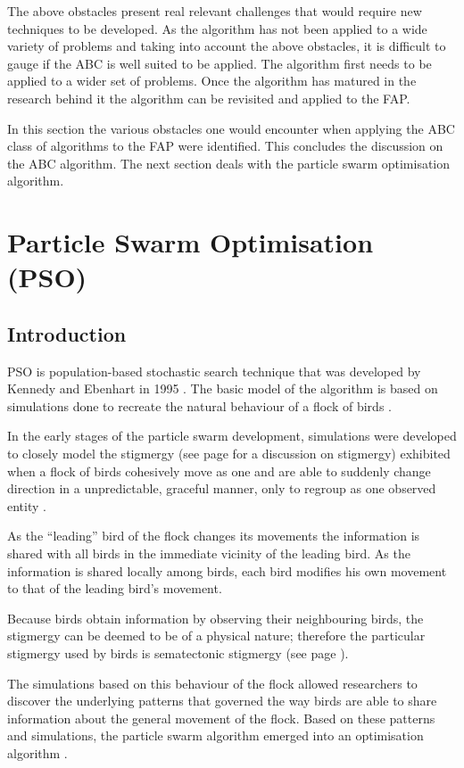 The above obstacles present real relevant challenges that would require new techniques to be developed. As the algorithm has not been applied to a wide variety of problems and taking into account the above obstacles, it is difficult to gauge if the ABC is well suited to be applied. The algorithm first needs to be applied to a wider set of problems. Once the algorithm has matured in the research behind it the algorithm can be revisited and applied to the FAP.

In this section the various obstacles one would encounter when applying the ABC class of algorithms to the FAP were identified. This concludes the discussion on the ABC algorithm. The next section deals with the particle swarm optimisation algorithm.
\section{Particle Swarm Optimisation (PSO)}

\label{sec:PSO}
\subsection{Introduction}
\label{sec:psointro}
PSO is population-based stochastic search technique that was developed by Kennedy and Ebenhart in 1995 \cite{PSOGABreeding}. The basic model of the algorithm is based on simulations done to recreate the natural behaviour of a flock of birds \cite{PSOSoftTesting}.

In the early stages of the particle swarm development, simulations were developed to closely model the stigmergy (see page \pageref{sec:stigmergy} for a discussion on stigmergy) exhibited when a flock of birds cohesively move as one and are able to suddenly change direction in a unpredictable, graceful manner, only to regroup as one observed entity \cite{PSOHybridJobShop}. 

As the ``leading'' bird of the flock changes its movements the information is shared with all birds in the immediate vicinity of the leading bird. As the information is shared locally among birds, each bird modifies his own movement to that of the leading bird's movement\cite{PSOHybridJobShop}. 

Because birds obtain information by observing their neighbouring birds, the stigmergy can be deemed to be of a physical nature; therefore the particular stigmergy used by birds is sematectonic stigmergy (see page \pageref{def:sematectonic}).

The simulations based on this behaviour of the flock allowed researchers to discover the underlying patterns that governed the way birds are able to share information about the general movement of the flock. Based on these patterns and simulations, the particle swarm algorithm emerged into an optimisation algorithm \cite{CompuIntelligenceIntro}.

